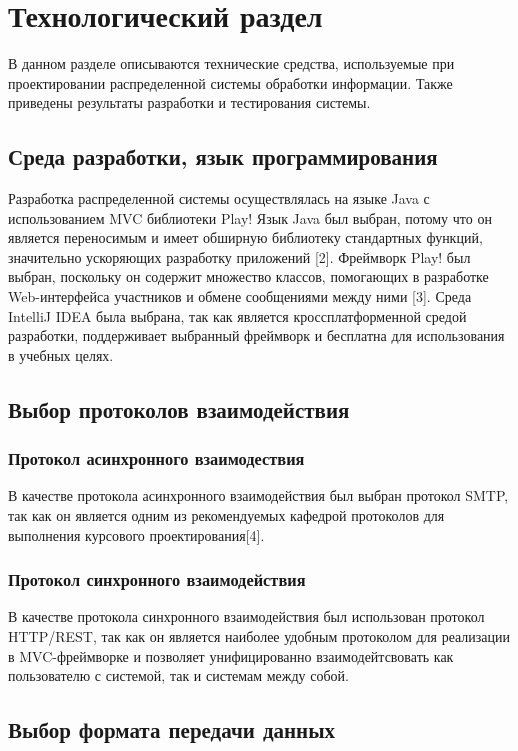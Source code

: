 \chapter{Технологический раздел}
\label{cha:impl}

В данном разделе описываются технические средства,  используемые при проектировании распределенной системы обработки информации. Также приведены результаты разработки и тестирования системы. 

\section{Среда разработки, язык программирования}
Разработка распределенной системы осуществлялась на языке Java с использованием MVC библиотеки Play!
Язык Java был выбран, потому что он является переносимым и имеет обширную библиотеку стандартных функций, значительно ускоряющих разработку приложений [2]. Фреймворк Play! был выбран, поскольку он содержит множество классов, помогающих в разработке Web-интерфейса участников и обмене сообщениями между ними [3]. Среда IntelliJ IDEA была выбрана, так как является кроссплатформенной средой разработки, поддерживает выбранный фреймворк и бесплатна для использования в учебных целях.

\section{Выбор протоколов взаимодействия}

\subsection{Протокол асинхронного взаимодествия}

В качестве протокола асинхронного взаимодействия был выбран протокол SMTP, так как он является одним из рекомендуемых кафедрой протоколов для выполнения курсового проектирования[4].

\subsection{Протокол синхронного взаимодействия}

В качестве протокола синхронного взаимодействия был использован протокол HTTP/REST, так как он является наиболее удобным протоколом для реализации в MVC-фреймворке и позволяет унифицированно взаимодейтсвовать как пользователю с системой, так и системам между собой.

\section{Выбор формата передачи данных}

